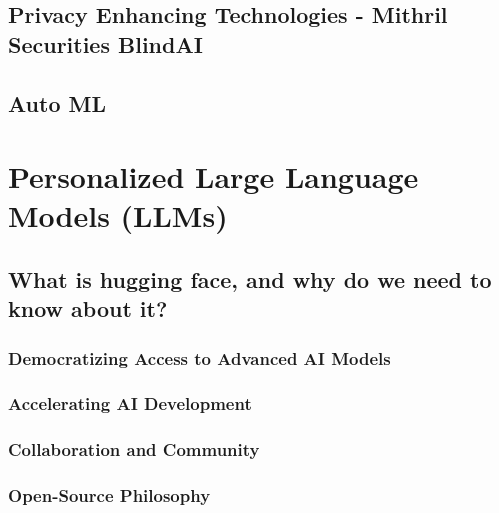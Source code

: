\documentclass[
]{book}
\begin{document}
\hypertarget{privacy-enhancing-technologies---mithril-securities-blindai}{%
\section{Privacy Enhancing Technologies - Mithril Securities BlindAI}\label{privacy-enhancing-technologies---mithril-securities-blindai}}

\hypertarget{auto-ml}{%
\section{Auto ML}\label{auto-ml}}

\hypertarget{personalized-large-language-models-llms}{%
\chapter{Personalized Large Language Models (LLMs)}\label{personalized-large-language-models-llms}}

\hypertarget{what-is-hugging-face-and-why-do-we-need-to-know-about-it}{%
\section{What is hugging face, and why do we need to know about it?}\label{what-is-hugging-face-and-why-do-we-need-to-know-about-it}}

\hypertarget{democratizing-access-to-advanced-ai-models}{%
\subsection{Democratizing Access to Advanced AI Models}\label{democratizing-access-to-advanced-ai-models}}

\hypertarget{accelerating-ai-development}{%
\subsection{Accelerating AI Development}\label{accelerating-ai-development}}

\hypertarget{collaboration-and-community}{%
\subsection{Collaboration and Community}\label{collaboration-and-community}}

\hypertarget{open-source-philosophy}{%
\subsection{Open-Source Philosophy}\label{open-source-philosophy}}
\end{document}
